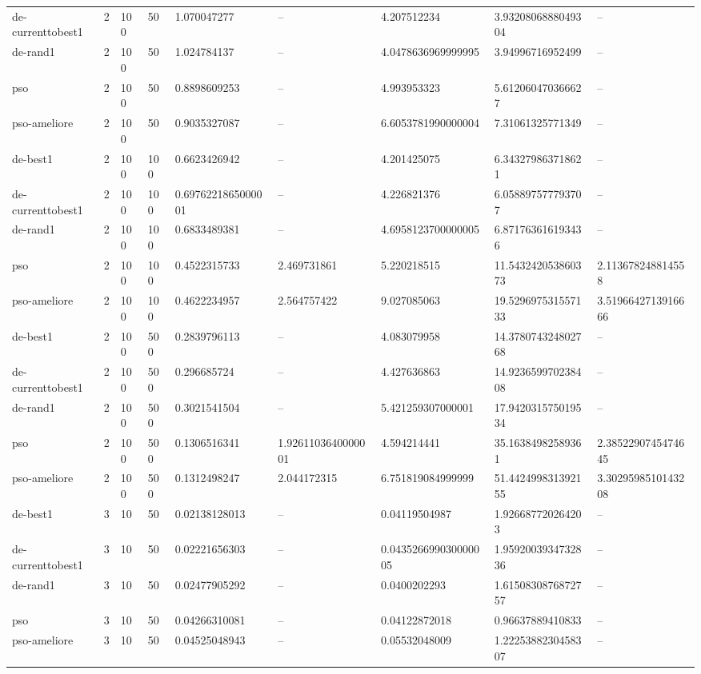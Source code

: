 \begin{table}[t]
\begin{tabular}{lllllllll}
de-currenttobest1 & 2 & 100 & 50 & 1.070047277 & -- & 4.207512234 & 3.9320806888049304 & -- \\
de-rand1 & 2 & 100 & 50 & 1.024784137 & -- & 4.0478636969999995 & 3.94996716952499 & -- \\
pso & 2 & 100 & 50 & 0.8898609253 & -- & 4.993953323 & 5.612060470366627 & -- \\
pso-ameliore & 2 & 100 & 50 & 0.9035327087 & -- & 6.6053781990000004 & 7.31061325771349 & -- \\
de-best1 & 2 & 100 & 100 & 0.6623426942 & -- & 4.201425075 & 6.343279863718621 & -- \\
de-currenttobest1 & 2 & 100 & 100 & 0.6976221865000001 & -- & 4.226821376 & 6.058897577793707 & -- \\
de-rand1 & 2 & 100 & 100 & 0.6833489381 & -- & 4.6958123700000005 & 6.871763616193436 & -- \\
pso & 2 & 100 & 100 & 0.4522315733 & 2.469731861 & 5.220218515 & 11.543242053860373 & 2.113678248814558 \\
pso-ameliore & 2 & 100 & 100 & 0.4622234957 & 2.564757422 & 9.027085063 & 19.529697531557133 & 3.5196642713916666 \\
de-best1 & 2 & 100 & 500 & 0.2839796113 & -- & 4.083079958 & 14.378074324802768 & -- \\
de-currenttobest1 & 2 & 100 & 500 & 0.296685724 & -- & 4.427636863 & 14.923659970238408 & -- \\
de-rand1 & 2 & 100 & 500 & 0.3021541504 & -- & 5.421259307000001 & 17.942031575019534 & -- \\
pso & 2 & 100 & 500 & 0.1306516341 & 1.9261103640000001 & 4.594214441 & 35.16384982589361 & 2.3852290745474645 \\
pso-ameliore & 2 & 100 & 500 & 0.1312498247 & 2.044172315 & 6.751819084999999 & 51.442499831392155 & 3.3029598510143208 \\
de-best1 & 3 & 10 & 50 & 0.02138128013 & -- & 0.04119504987 & 1.926687720264203 & -- \\
de-currenttobest1 & 3 & 10 & 50 & 0.02221656303 & -- & 0.043526699030000005 & 1.9592003934732836 & -- \\
de-rand1 & 3 & 10 & 50 & 0.02477905292 & -- & 0.0400202293 & 1.6150830876872757 & -- \\
pso & 3 & 10 & 50 & 0.04266310081 & -- & 0.04122872018 & 0.96637889410833 & -- \\
pso-ameliore & 3 & 10 & 50 & 0.04525048943 & -- & 0.05532048009 & 1.2225388230458307 & -- \\

\end{tabular}
\end{table}
